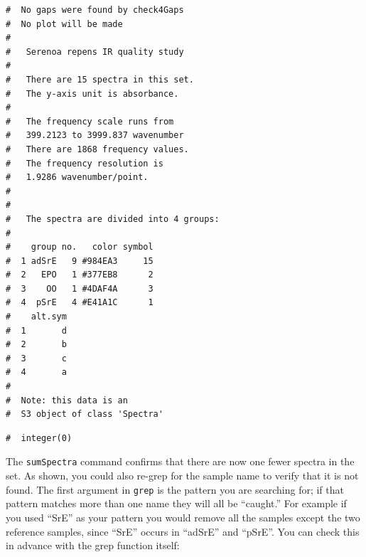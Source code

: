 \documentclass[letter,10pt,twocolumn,twoside,printwatermark=false]{pinp}
\begin{document}
\begin{Shaded}
\begin{Highlighting}[]
\StringTok{ }
   \NormalTok{(}\NormalTok{))}
\end{Highlighting}
\end{Shaded}

\begin{ShadedResult}
\begin{verbatim}
#  No gaps were found by check4Gaps
#  No plot will be made
#  
#   Serenoa repens IR quality study 
#  
#   There are 15 spectra in this set.
#   The y-axis unit is absorbance.
#  
#   The frequency scale runs from
#   399.2123 to 3999.837 wavenumber
#   There are 1868 frequency values.
#   The frequency resolution is
#   1.9286 wavenumber/point.
#  
#  
#   The spectra are divided into 4 groups: 
#  
#    group no.   color symbol
#  1 adSrE   9 #984EA3     15
#  2   EPO   1 #377EB8      2
#  3    OO   1 #4DAF4A      3
#  4  pSrE   4 #E41A1C      1
#    alt.sym
#  1       d
#  2       b
#  3       c
#  4       a
#  
#  Note: this data is an
#  S3 object of class 'Spectra'
\end{verbatim}
\end{ShadedResult}

\begin{Shaded}
\begin{Highlighting}[]
\NormalTok{(}\OperatorTok{$}
\end{Highlighting}
\end{Shaded}

\begin{ShadedResult}
\begin{verbatim}
#  integer(0)
\end{verbatim}
\end{ShadedResult}

The \texttt{sumSpectra} command confirms that there are now one fewer
spectra in the set. As shown, you could also re-grep for the sample name
to verify that it is not found. The first argument in \texttt{grep} is
the pattern you are searching for; if that pattern matches more than one
name they will all be ``caught.'' For example if you used ``SrE'' as
your pattern you would remove all the samples except the two reference
samples, since ``SrE'' occurs in ``adSrE'' and ``pSrE''. You can check
this in advance with the grep function itself:
\end{document}
